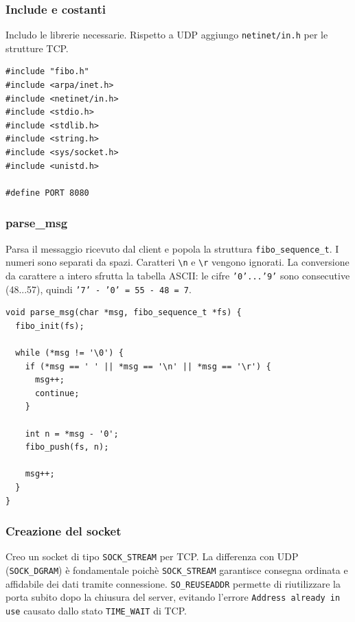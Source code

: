 \documentclass[a4paper,12pt]{article}
\begin{document}
\subsubsection{Include e costanti}
Includo le librerie necessarie. Rispetto a UDP aggiungo \texttt{netinet/in.h}
per le strutture TCP.

\begin{lstlisting}[caption={server\_tcp\_block.c - Include}]
#include "fibo.h"
#include <arpa/inet.h>
#include <netinet/in.h>
#include <stdio.h>
#include <stdlib.h>
#include <string.h>
#include <sys/socket.h>
#include <unistd.h>

#define PORT 8080
\end{lstlisting}
\FloatBarrier

\subsubsection{parse\_msg}
Parsa il messaggio ricevuto dal client e popola la struttura \texttt{fibo\_sequence\_t}.
I numeri sono separati da spazi. Caratteri \texttt{\textbackslash n} e \texttt{\textbackslash r} vengono ignorati.
\newline
La conversione da carattere a intero sfrutta la tabella ASCII: le cifre
\texttt{'0'...'9'} sono consecutive (48...57), quindi \texttt{'7' - '0' = 55 - 48 = 7}.

\begin{lstlisting}[caption={server\_tcp\_block.c - parse\_msg()}]
void parse_msg(char *msg, fibo_sequence_t *fs) {
  fibo_init(fs);

  while (*msg != '\0') {
    if (*msg == ' ' || *msg == '\n' || *msg == '\r') {
      msg++;
      continue;
    }

    int n = *msg - '0';
    fibo_push(fs, n);

    msg++;
  }
}
\end{lstlisting}
\FloatBarrier

\subsubsection{Creazione del socket}
Creo un socket di tipo \texttt{SOCK\_STREAM} per TCP. La differenza con UDP
(\texttt{SOCK\_DGRAM}) è fondamentale poichè \texttt{SOCK\_STREAM} garantisce
consegna ordinata e affidabile dei dati tramite connessione.
\newline
\texttt{SO\_REUSEADDR} permette di riutilizzare la porta subito dopo la chiusura
del server, evitando l'errore \texttt{Address already in use} causato dallo stato
\texttt{TIME\_WAIT} di TCP.
\end{document}
